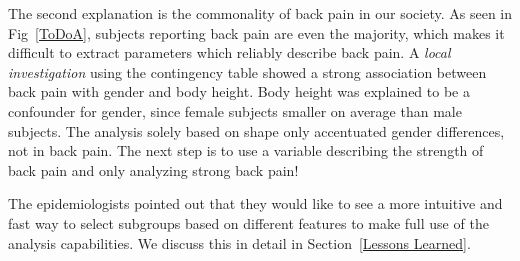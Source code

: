 \documentclass[journal]{style/vgtc} 			          %
\newcommand{\com}[1]{\textcolor{orange}{\uline{#1}}}
\begin{document}
The second explanation is the commonality of back pain in our society.
%
As seen in Fig~\ref{ToDoA}, subjects reporting back pain are even the majority, which makes it difficult to extract parameters which reliably describe back pain.
%
A \emph{local investigation} using the contingency table showed a strong association between back pain with gender and body height.
%
Body height was explained to be a confounder for gender, since female subjects smaller on average than male subjects.
%
The analysis solely based on shape only accentuated gender differences, not in back pain.
%
The next step is to use a variable describing the strength of back pain and only analyzing strong back pain!

The epidemiologists pointed out that they would like to see a more intuitive and fast way to select subgroups based on different features to make full use of the analysis capabilities.
%
We discuss this in detail in Section~\ref{Lessons Learned}.

%
\end{document}
